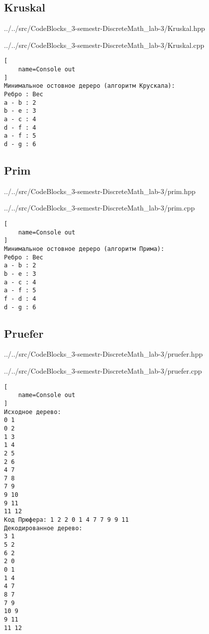 \newpage

\subsection{Kruskal}


{../../src/CodeBlocks_3-semestr-DiscreteMath_lab-3/Kruskal.hpp}


{../../src/CodeBlocks_3-semestr-DiscreteMath_lab-3/Kruskal.cpp}

\begin{lstlisting}[
    name=Console out
]
Минимальное остовное дереро (алгоритм Крускала):
Ребро : Вес
a - b : 2
b - e : 3
a - c : 4
d - f : 4
a - f : 5
d - g : 6
\end{lstlisting}

\newpage

\subsection{Prim}


{../../src/CodeBlocks_3-semestr-DiscreteMath_lab-3/prim.hpp}


{../../src/CodeBlocks_3-semestr-DiscreteMath_lab-3/prim.cpp}

\begin{lstlisting}[
    name=Console out
]
Минимальное остовное дереро (алгоритм Прима):
Ребро : Вес
a - b : 2
b - e : 3
a - c : 4
a - f : 5
f - d : 4
d - g : 6
\end{lstlisting}

\newpage

\subsection{Pruefer}


{../../src/CodeBlocks_3-semestr-DiscreteMath_lab-3/pruefer.hpp}


{../../src/CodeBlocks_3-semestr-DiscreteMath_lab-3/pruefer.cpp}

\begin{lstlisting}[
    name=Console out
]
Исходное дерево:
0 1
0 2
1 3
1 4
2 5
2 6
4 7
7 8
7 9
9 10
9 11
11 12
Код Прюфера: 1 2 2 0 1 4 7 7 9 9 11 
Декодированное дерево:
3 1
5 2
6 2
2 0
0 1
1 4
4 7
8 7
7 9
10 9
9 11
11 12
\end{lstlisting}

